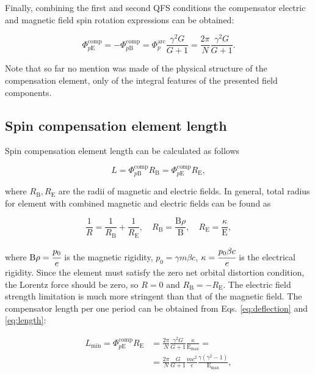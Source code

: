 \documentclass[submitting]{nst}
\begin{document}
 \par Finally, combining the first and second QFS conditions the compensator electric and magnetic field spin rotation expressions can be obtained:

\begin{equation}
	\Phi_{p\mathrm{E}}^{\textrm{comp}} = - \Phi_{p\mathrm{B}}^{\textrm{comp}} = {\Phi}_{p}^{\text{arc}}\frac{\gamma^2 G}{G+1} =\frac{2\pi}{N}\frac{\gamma^2 G}{G+1}.
	\label{eq:deflection}
\end{equation}

\noindent Note that so far no mention was made of the physical structure of the compensation element, only of the integral features of the presented field components.

\subsection{Spin compensation element length}

Spin compensation element length can be calculated as follows

\begin{equation}
	L = \Phi_{p\mathrm{B}}^{\text{comp}}R_{\mathrm{B}} = \Phi_{p\mathrm{E}}^{\text{comp}}R_{\mathrm{E}},
	\label{eq:length}
\end{equation}

\noindent where $R_{\mathrm{B}}, R_{\mathrm{E}}$ are the radii of magnetic and electric fields. In general, total radius for element with combined magnetic and electric fields can be found as

\begin{equation}
	\frac{1}{R} = \frac{1}{R_{\mathrm{B}}}+\frac{1}{R_{\mathrm{E}}}, \quad R_{\mathrm{B}}=\frac{\mathrm{B}\rho}{\mathrm{B}}, \quad R_{\mathrm{E}}=\frac{\kappa}{\mathrm{E}},    
	\label{eq:total_radius}
\end{equation}

\noindent where $\mathrm{B}\rho = \cfrac{p_{0}}{e}$ is the magnetic rigidity, $p_{0} = \gamma m\beta c$, $\kappa = \cfrac{p_{0}\beta c}{e}$ is the electrical rigidity. Since the element must satisfy the zero net orbital distortion condition, the Lorentz force should be zero, so $R=0$ and $R_{\mathrm{B}} = -R_{\mathrm{E}}$. The electric field strength limitation is much more stringent than that of the magnetic field. The compensator length per one period can be obtained from Eqs. \ref{eq:deflection} and \ref{eq:length}:

\begin{equation}
	\begin{aligned}
	L_{\text{min}} = \Phi_{p\mathrm{E}}^{\text{comp}}R_{\mathrm{E}} & = 
	\frac{2\pi}{N}\frac{\gamma^2 G}{G+1}\frac{\kappa}{\mathrm{E}_{\text{max}}} = \\
	& = \frac{2\pi}{N}\frac{G}{G+1}\frac{mc^2}{e}\frac{\gamma(\gamma^2-1)}{\mathrm{E}_{\text{max}}},
	\label{eq:length_min}
	\end{aligned}
\end{equation}
\end{document}
